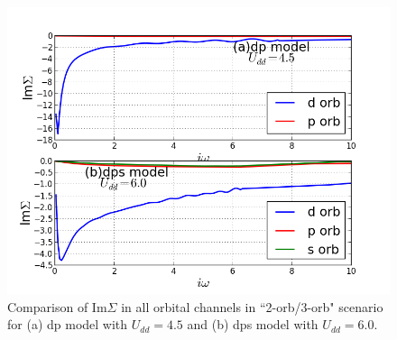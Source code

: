 \documentclass[10pt]{ruthesis}
\begin{document}
{%

\begin{figure}[th]
 \includegraphics[width=\columnwidth]{./plotForpublishing/pd+dpssigma.png}
 \caption{\label{fig3}Comparison of Im$\Sigma$ in all orbital channels in ``2-orb/3-orb" scenario for (a) dp model with $U_{dd}=4.5 $ and (b) dps model with $U_{dd}=6.0$.}
\end{figure}

}
\end{document}
